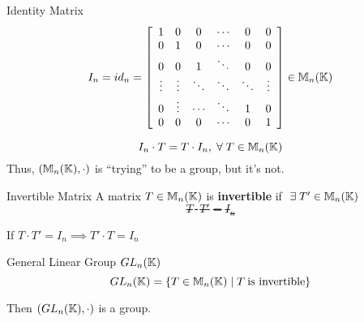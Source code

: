 \begin{definition} {Identity Matrix}
    \[
        I_n = id_n = \left[
            \begin{array}{cccccc}
                1      & 0      & 0      & \cdots & 0      & 0      \\
                0      & 1      & 0      & \cdots & 0      & 0      \\
                0      & 0      & 1      & \ddots & 0      & 0      \\
                \vdots & \vdots & \ddots & \ddots & \ddots & \vdots \\
                0      & \vdots & \cdots & \ddots & 1      & 0      \\
                0      & 0      & 0      & \cdots & 0      & 1      \\
            \end{array}
            \right] \in \mathbb{M}_n(\mathbb{K})
    \]
\end{definition}

\begin{observe}
    \[
        I_n \cdot T = T \cdot I_n, \forall T \in \bbm_n(\bbk)
    \]
    Thus, \((\mathbb{M}_n(\mathbb{K}), \cdot)\) is ``trying'' to be a group, but it's not.
\end{observe}

\begin{definition} {Invertible Matrix}
    A matrix \(T \in \mathbb{M}_n(\mathbb{K})\) is \textbf{invertible} if \(\exists T' \in \bbm_n(\bbk)\) \st \[T \cdot T' = I_n\]
\end{definition}
\begin{exercise}
    If \(T \cdot T' = I_n \implies T' \cdot T = I_n\)
\end{exercise}

\begin{definition} {General Linear Group \(GL_n(\mathbb{K})\)}
    \[GL_n(\mathbb{K}) = \{T\in \mathbb{M}_n(\mathbb{K}) \mid T \:\text{is invertible}\}\]
\end{definition}

\begin{remark}
    Then \((GL_n(\mathbb{K}), \cdot)\) is a group.
\end{remark}

